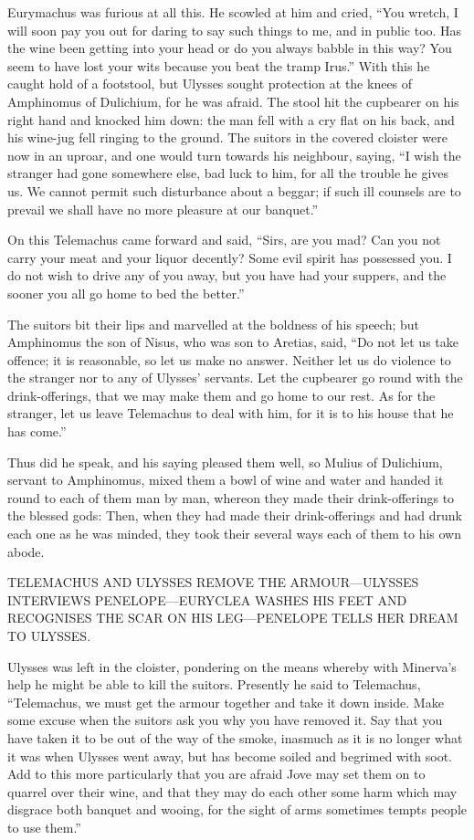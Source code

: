Eurymachus was furious at all this. He scowled at him and cried, “You wretch, I
will soon pay you out for daring to say such things to me, and in public too.
Has the wine been getting into your head or do you always babble in this way?
You seem to have lost your wits because you beat the tramp Irus.” With this he
caught hold of a footstool, but Ulysses sought protection at the knees of
Amphinomus of Dulichium, for he was afraid. The stool hit the cupbearer on his
right hand and knocked him down: the man fell with a cry flat on his back, and
his wine-jug fell ringing to the ground. The suitors in the covered cloister
were now in an uproar, and one would turn towards his neighbour, saying, “I
wish the stranger had gone somewhere else, bad luck to him, for all the trouble
he gives us. We cannot permit such disturbance about a beggar; if such ill
counsels are to prevail we shall have no more pleasure at our banquet.”

On this Telemachus came forward and said, “Sirs, are you mad? Can you not carry
your meat and your liquor decently? Some evil spirit has possessed you. I do
not wish to drive any of you away, but you have had your suppers, and the
sooner you all go home to bed the better.”

The suitors bit their lips and marvelled at the boldness of his speech; but
Amphinomus the son of Nisus, who was son to Aretias, said, “Do not let us take
offence; it is reasonable, so let us make no answer. Neither let us do violence
to the stranger nor to any of Ulysses’ servants. Let the cupbearer go round
with the drink-offerings, that we may make them and go home to our rest. As for
the stranger, let us leave Telemachus to deal with him, for it is to his house
that he has come.”

Thus did he speak, and his saying pleased them well, so Mulius of Dulichium,
servant to Amphinomus, mixed them a bowl of wine and water and handed it round
to each of them man by man, whereon they made their drink-offerings to the
blessed gods: Then, when they had made their drink-offerings and had drunk each
one as he was minded, they took their several ways each of them to his own
abode.


TELEMACHUS AND ULYSSES REMOVE THE ARMOUR—ULYSSES INTERVIEWS PENELOPE—EURYCLEA
WASHES HIS FEET AND RECOGNISES THE SCAR ON HIS LEG—PENELOPE TELLS HER DREAM TO
ULYSSES.

Ulysses was left in the cloister, pondering on the means whereby with Minerva’s
help he might be able to kill the suitors. Presently he said to Telemachus,
“Telemachus, we must get the armour together and take it down inside. Make some
excuse when the suitors ask you why you have removed it. Say that you have
taken it to be out of the way of the smoke, inasmuch as it is no longer what it
was when Ulysses went away, but has become soiled and begrimed with soot. Add
to this more particularly that you are afraid Jove may set them on to quarrel
over their wine, and that they may do each other some harm which may disgrace
both banquet and wooing, for the sight of arms sometimes tempts people to use
them.”


